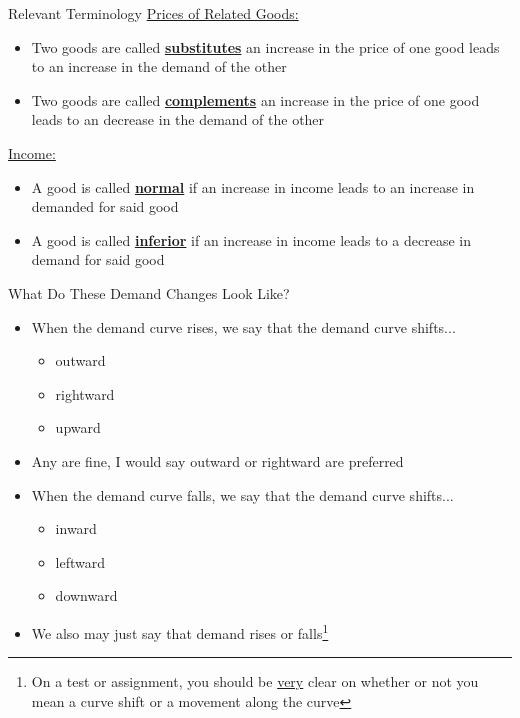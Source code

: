 \documentclass[10pt,xcolor={svgnames}]{beamer}
\begin{document}
\begin{frame}{Relevant Terminology}
\underline{Prices of Related Goods:}
    \begin{itemize}[<+->]
        \item Two goods are called \underline{\textbf{substitutes}} an increase in the price of one good leads to an increase in the demand of the other
        \item Two goods are called \underline{\textbf{complements}} an increase in the price of one good leads to an decrease in the demand of the other
    \end{itemize}
    \pause 
\underline{Income:}
    \begin{itemize}[<+->]
        \item A good is called \underline{\textbf{normal}} if an increase in income leads to an increase in demanded for said good
        \item A good is called \underline{\textbf{inferior}} if an increase in income leads to a decrease in demand for said good
    \end{itemize}
\end{frame}

\begin{frame}{What Do These Demand Changes Look Like?}
    \begin{itemize}[<+->]
        \item When the demand curve rises, we say that the demand curve shifts...
        \begin{itemize}
            \item outward
            \item rightward
            \item upward
        \end{itemize}
        \item Any are fine, I would say outward or rightward are preferred
        \item When the demand curve falls, we say that the demand curve shifts...
        \begin{itemize}
            \item inward
            \item leftward
            \item downward
        \end{itemize}
        \item We also may just say that demand rises or falls\footnote{On a test or assignment, you should be \underline{very} clear on whether or not you mean a curve shift or a movement along the curve}
    \end{itemize}
\end{frame}
\end{document}
